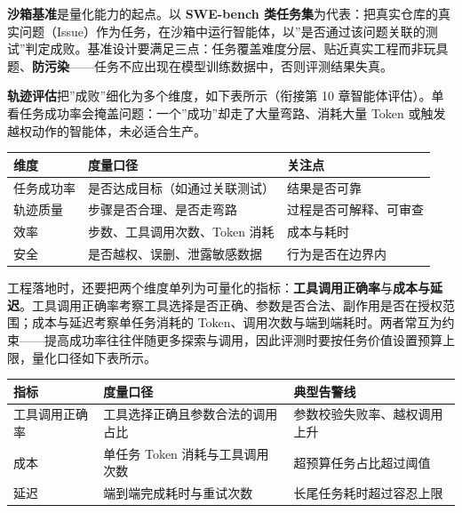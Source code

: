 \documentclass[12pt,a4paper,twoside,openany]{ctexbook}
\numberwithin{figure}{chapter}
\numberwithin{table}{chapter}
\newcounter{none}
\begin{document}
\textbf{沙箱基准}是量化能力的起点。以 \textbf{SWE-bench
类任务集}为代表：把真实仓库的真实问题（Issue）作为任务，在沙箱中运行智能体，以''是否通过该问题关联的测试''判定成败。基准设计要满足三点：任务覆盖难度分层、贴近真实工程而非玩具题、\textbf{防污染}------任务不应出现在模型训练数据中，否则评测结果失真。

\textbf{轨迹评估}把''成败''细化为多个维度，如下表所示（衔接第 10
章智能体评估）。单看任务成功率会掩盖问题：一个''成功''却走了大量弯路、消耗大量
Token 或触发越权动作的智能体，未必适合生产。

{\def\LTcaptype{none} %
\begin{longtable}[]{@{}lll@{}}
\toprule\noalign{}
维度 & 度量口径 & 关注点 \\
\midrule\noalign{}
\endhead
\bottomrule\noalign{}
\endlastfoot
任务成功率 & 是否达成目标（如通过关联测试） & 结果是否可靠 \\
轨迹质量 & 步骤是否合理、是否走弯路 & 过程是否可解释、可审查 \\
效率 & 步数、工具调用次数、Token 消耗 & 成本与耗时 \\
安全 & 是否越权、误删、泄露敏感数据 & 行为是否在边界内 \\
\end{longtable}
}

工程落地时，还要把两个维度单列为可量化的指标：\textbf{工具调用正确率}与\textbf{成本与延迟}。工具调用正确率考察工具选择是否正确、参数是否合法、副作用是否在授权范围；成本与延迟考察单任务消耗的
Token、调用次数与端到端耗时。两者常互为约束------提高成功率往往伴随更多探索与调用，因此评测时要按任务价值设置预算上限，量化口径如下表所示。

{\def\LTcaptype{none} %
\begin{longtable}[]{@{}
  >{\raggedright\arraybackslash}p{}
  >{\raggedright\arraybackslash}p{}
  >{\raggedright\arraybackslash}p{}@{}}
\toprule\noalign{}
\begin{minipage}[b]{\linewidth}\raggedright
指标
\end{minipage} & \begin{minipage}[b]{\linewidth}\raggedright
度量口径
\end{minipage} & \begin{minipage}[b]{\linewidth}\raggedright
典型告警线
\end{minipage} \\
\midrule\noalign{}
\endhead
\bottomrule\noalign{}
\endlastfoot
工具调用正确率 & 工具选择正确且参数合法的调用占比 &
参数校验失败率、越权调用上升 \\
成本 & 单任务 Token 消耗与工具调用次数 & 超预算任务占比超过阈值 \\
延迟 & 端到端完成耗时与重试次数 & 长尾任务耗时超过容忍上限 \\
\end{longtable}
}
\end{document}
